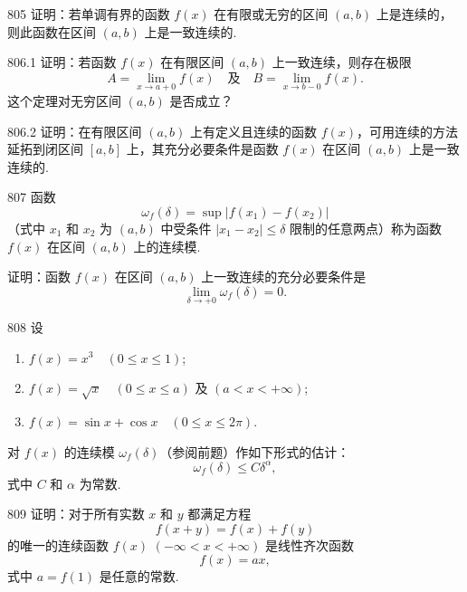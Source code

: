 \begin{prob}[M]{805}
证明：若单调有界的函数 $f(x)$ 在有限或无穷的区间 $(a, b)$ 上是连续的，则此函数在区间 $(a, b)$ 上是一致连续的.
\end{prob}

\begin{prob}[M]{806.1}
证明：若函数 $f(x)$ 在有限区间 $(a, b)$ 上一致连续，则存在极限
\[
A = \lim_{x \to a+0} f(x) \quad \text{及} \quad B = \lim_{x \to b-0} f(x).
\]
这个定理对无穷区间 $(a, b)$ 是否成立？
\end{prob}

\begin{prob}[M]{806.2}
证明：在有限区间 $(a, b)$ 上有定义且连续的函数 $f(x)$，可用连续的方法延拓到闭区间 $[a, b]$ 上，其充分必要条件是函数 $f(x)$ 在区间 $(a, b)$ 上是一致连续的.
\end{prob}

\begin{prob}[M]{807}
函数
\[
\omega_f(\delta) = \sup |f(x_1) - f(x_2)|
\]
（式中 $x_1$ 和 $x_2$ 为 $(a, b)$ 中受条件 $|x_1 - x_2| \leqslant \delta$ 限制的任意两点）称为函数 $f(x)$ 在区间 $(a, b)$ 上的连续模.

证明：函数 $f(x)$ 在区间 $(a, b)$ 上一致连续的充分必要条件是
\[
\lim_{\delta \to +0} \omega_f(\delta) = 0.
\]
\end{prob}

\begin{prob}[L]{808}
设
\begin{enumerate}[label=(\alph*), itemsep=2pt, topsep=3pt]
    \item $f(x) = x^3 \quad (0 \leqslant x \leqslant 1)$;
    \item $f(x) = \sqrt{x} \quad (0 \leqslant x \leqslant a) \text{ 及 } (a < x < +\infty)$;
    \item $f(x) = \sin x + \cos x \quad (0 \leqslant x \leqslant 2\pi).$
\end{enumerate}
对 $f(x)$ 的连续模 $\omega_f(\delta)$（参阅前题）作如下形式的估计：
\[
\omega_f(\delta) \leqslant C\delta^{\alpha},
\]
式中 $C$ 和 $\alpha$ 为常数.
\end{prob}


\begin{prob}[M]{809}
证明：对于所有实数 $x$ 和 $y$ 都满足方程
\[
f(x + y) = f(x) + f(y) \tag{1}
\]
的唯一的连续函数 $f(x)$ $(-\infty < x < +\infty)$ 是线性齐次函数
\[
f(x) = ax,
\]
式中 $a = f(1)$ 是任意的常数.
\end{prob}

